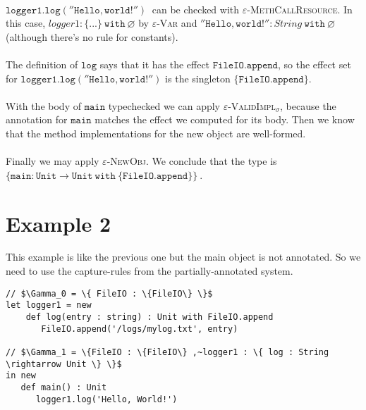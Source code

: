 \documentclass{llncs}
\newcommand{\keywadj}[1]{\mathtt{#1}}
\newcommand{\keyw}[1]{\keywadj{#1}~}
\begin{document}
\paragraph{}
$\keyw{logger1.log(''Hello, world!'')}$ can be checked with \textsc{$\varepsilon$-MethCallResource}. In this case, $logger1 : \{ ... \}~\keyw{with} \varnothing$ by \textsc{$\varepsilon$-Var} and $\keywadj{''Hello, world!''} : String~\keyw{with} \varnothing$ (although there's no rule for constants).

\paragraph{}
The definition of $\keywadj{log}$ says that it has the effect $\keywadj{FileIO.append}$, so the effect set for $\keywadj{logger1.log(''Hello, world!'')}$ is the singleton
$\keywadj{\{FileIO.append\}}$.

\paragraph{}
With the body of $\keywadj{main}$ typechecked we can apply \textsc{$\varepsilon$-ValidImpl$_\sigma$}, because the annotation for $\keywadj{main}$ matches the effect we computed for its body. Then we know that the method implementations for the new object are well-formed.

\paragraph{}
Finally we may apply \textsc{$\varepsilon$-NewObj}. We conclude that the type is $\keyw{\{ main : Unit \rightarrow Unit~with~\{FileIO.append\} \}}$.


\section{Example 2}

This example is like the previous one but the main object is not annotated. So we need to use the capture-rules from the partially-annotated system.\\

\vspace{-6pt}
\begin{lstlisting}[xleftmargin=20pt]
// $\Gamma_0 = \{ FileIO : \{FileIO\} \}$
let logger1 = new
    def log(entry : string) : Unit with FileIO.append
       FileIO.append('/logs/mylog.txt', entry)
 
// $\Gamma_1 = \{FileIO : \{FileIO\} ,~logger1 : \{ log : String \rightarrow Unit \} \}$
in new
   def main() : Unit
      logger1.log('Hello, World!')
\end{lstlisting}
\end{document}
